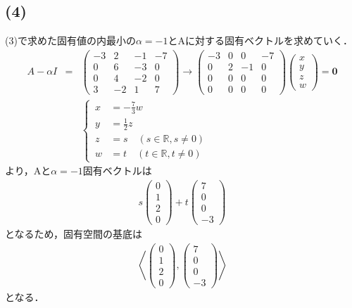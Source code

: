 \documentclass[11pt, titlepage]{jsarticle}
\begin{document}
\subsection*{(4)}
(3)で求めた固有値の内最小の$\alpha=-1$とAに対する固有ベクトルを求めていく．
\begin{eqnarray*}
  A-\alpha I&=&\begin{pmatrix}
    -3 & 2  & -1 & -7 \\
    0  & 6  & -3 & 0  \\
    0  & 4  & -2 & 0  \\
    3  & -2 & 1  & 7
  \end{pmatrix}\rightarrow\begin{pmatrix}
    -3 & 0 & 0  & -7 \\
    0  & 2 & -1 & 0  \\
    0  & 0 & 0  & 0  \\
    0  & 0 & 0  & 0
  \end{pmatrix}\begin{pmatrix}
    x \\
    y \\
    z \\
    w
  \end{pmatrix}=\boldsymbol 0\\
  &&
  \left\{ \,
  \begin{aligned}
    x & =-\frac{7}{3}w                   \\
    y & =\frac{1}{2}z                    \\
    z & =s\quad (s\in\mathbb R, s\neq 0) \\
    w & =t\quad (t\in\mathbb R, t\neq 0)
  \end{aligned}
  \right.
\end{eqnarray*}
より，Aと$\alpha=-1$固有ベクトルは
\begin{eqnarray*}
  s
  \begin{pmatrix}
    0 \\
    1 \\
    2 \\
    0
  \end{pmatrix}+t \begin{pmatrix}
    7 \\
    0 \\
    0 \\
    -3
  \end{pmatrix}
\end{eqnarray*}
となるため，固有空間の基底は
\begin{eqnarray*}
  \left\langle
  \begin{pmatrix}
    0 \\
    1 \\
    2 \\
    0
  \end{pmatrix},\begin{pmatrix}
    7 \\
    0 \\
    0 \\
    -3
  \end{pmatrix}
  \right\rangle
\end{eqnarray*}
となる．
\end{document}
